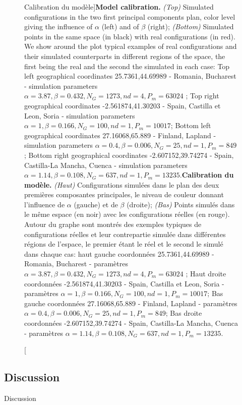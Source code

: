 \begin{figure}
\caption[Model calibration][Calibration du modèle]{\textbf{Model calibration.} \textit{(Top)} Simulated configurations in the two first principal components plan, color level giving the influence of $\alpha$ (left) and of $\beta$ (right); \textit{(Bottom)} Simulated points in the same space (in black) with real configurations (in red). We show around the plot typical examples of real configurations and their simulated counterparts in different regions of the space, the first being the real and the second the simulated in each case: Top left geographical coordinates 25.7361,44.69989 - Romania, Bucharest - simulation parameters $\alpha=3.87,\beta=0.432,N_G=1273,nd=4,P_m=63024$ ; Top right geographical coordinates -2.561874,41.30203 - Spain, Castilla et Leon, Soria - simulation parameters $\alpha=1,\beta=0.166,N_G=100,nd=1,P_m=10017$; Bottom left geographical coordinates 27.16068,65.889 - Finland, Lapland - simulation parameters $\alpha=0.4,\beta=0.006,N_G=25,nd=1,P_m=849$; Bottom right geographical coordinates -2.607152,39.74274 - Spain, Castilla-La Mancha, Cuenca - simulation parameters $\alpha=1.14,\beta=0.108,N_G=637,nd=1,P_m=13235$.\label{fig:densitycalib}}{\textbf{Calibration du modèle.} \textit{(Haut)} Configurations simulées dans le plan des deux premières composantes principales, le niveau de couleur donnant l'influence de $\alpha$ (gauche) et de $\beta$ (droite); \textit{(Bas)} Points simulés dans le même espace (en noir) avec les configurations réelles (en rouge). Autour du graphe sont montrés des exemples typiques de configurations réelles et leur contrepartie simulée dans différentes régions de l'espace, le premier étant le réel et le second le simulé dans chaque cas: haut gauche coordonnées 25.7361,44.69989 - Romania, Bucharest - paramètres $\alpha=3.87,\beta=0.432,N_G=1273,nd=4,P_m=63024$ ; Haut droite coordonnées -2.561874,41.30203 - Spain, Castilla et Leon, Soria - paramètres $\alpha=1,\beta=0.166,N_G=100,nd=1,P_m=10017$; Bas gauche coordonnées 27.16068,65.889 - Finland, Lapland - paramètres $\alpha=0.4,\beta=0.006,N_G=25,nd=1,P_m=849$; Bas droite coordonnées -2.607152,39.74274 - Spain, Castilla-La Mancha, Cuenca - paramètres $\alpha=1.14,\beta=0.108,N_G=637,nd=1,P_m=13235$.\label{fig:densitycalib}}
\end{figure}


\subsection{Discussion}{Discussion}




